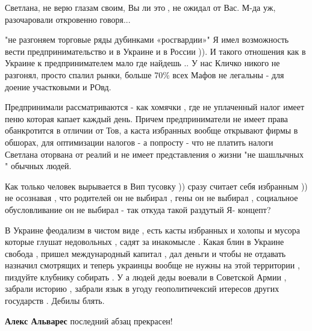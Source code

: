 \begin{itemize}
Светлана, не верю глазам своим, Вы ли это🤔, не ожидал от Вас. М-да уж, разочаровали откровенно говоря...

 

"не разгоняем торговые ряды дубинками «росгвардии»" Я имел возможность вести
предпринимательство и в Украине и в России )). И такого отношения как в Украине
к предпринимателем мало где найдешь .. У нас Кличко никого не разгонял, просто
спалил рынки, больше 70\% всех Мафов не легальны - для доение участковыми и
РОвд. 

Предпринимали рассматриваются - как хомячки , где не уплаченный налог имеет
пеню которая капает каждый день. Причем предприниматели не имеет права
обанкротится в отличии от Тов, а каста избранных вообще открывают фирмы в
обшорах, для оптимизации налогов - а попросту - что не платить налоги Светлана
оторвана от реалий и не имеет представления о жизни "не шашлычных " обычных
людей. 

Как только человек вырывается в Вип тусовку )) сразу считает себя избранным ))
не осознавая , что родителей он не выбирал , гены он не выбирал , социальное
обусловливание он не выбирал - так откуда такой раздутый Я- концепт?

В Украине феодализм в чистом виде , есть касты избранных и холопы и мусора
которые глушат недовольных , садят за инакомысле . Какая блин в Украине свобода
, пришел международный капитал , дал деньги и чтобы не отдавать назначил
смотрящих и теперь украинцы вообще не нужны на этой территории , пиздуйте
клубнику собирать . У а людей деды воевали в Советской Армии , забрали историю
, забрали язык в угоду геополитичексий итересов других государств . Дебилы
блять.

\begin{itemize}
 
\textbf{Алекс Альварес} последний абзац прекрасен!
\end{itemize}

 

\end{itemize}
